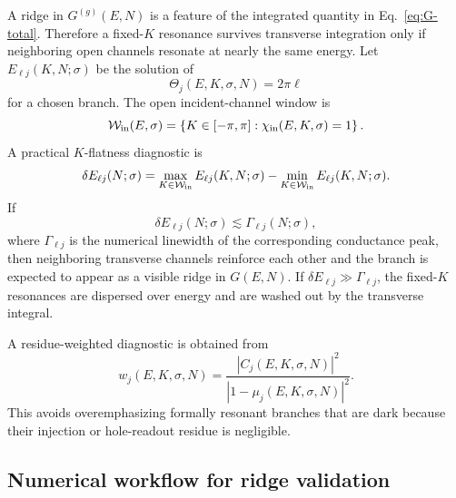 A ridge in $G^{(g)}(E,N)$ is a feature of the integrated quantity in Eq.~\eqref{eq:G-total}.  Therefore a fixed-$K$ resonance survives transverse integration only if neighboring open channels resonate at nearly the same energy.  Let $E_{\ell j}(K,N;\sigma)$ be the solution of
\begin{equation}
    \Theta_j(E,K,\sigma,N)=2\pi\ell
    \label{eq:E-ellj-definition}
\end{equation}
for a chosen branch.  The open incident-channel window is
\begin{equation}
    \mathcal W_{\rm in}(E,\sigma)
    =
    \left\{K\in[-\pi,\pi]:\chi_{\rm in}(E,K,\sigma)=1\right\}.
    \label{eq:Win-definition}
\end{equation}
A practical $K$-flatness diagnostic is
\begin{equation}
    \delta E_{\ell j}(N;\sigma)
    =
    \max_{K\in\mathcal W_{\rm in}}E_{\ell j}(K,N;\sigma)
    -
    \min_{K\in\mathcal W_{\rm in}}E_{\ell j}(K,N;\sigma).
    \label{eq:K-flatness}
\end{equation}
If
\begin{equation}
    \delta E_{\ell j}(N;\sigma)
    \lesssim
    \Gamma_{\ell j}(N;\sigma),
    \label{eq:flatness-linewidth}
\end{equation}
where $\Gamma_{\ell j}$ is the numerical linewidth of the corresponding conductance peak, then neighboring transverse channels reinforce each other and the branch is expected to appear as a visible ridge in $G(E,N)$.  If $\delta E_{\ell j}\gg\Gamma_{\ell j}$, the fixed-$K$ resonances are dispersed over energy and are washed out by the transverse integral.

A residue-weighted diagnostic is obtained from
\begin{equation}
    w_j(E,K,\sigma,N)
    =
    \frac{|C_j(E,K,\sigma,N)|^2}
    {|1-\mu_j(E,K,\sigma,N)|^2}.
    \label{eq:residue-weight}
\end{equation}
This avoids overemphasizing formally resonant branches that are dark because their injection or hole-readout residue is negligible.

\subsection{Numerical workflow for ridge validation}
\label{subsec:ridge-workflow}

